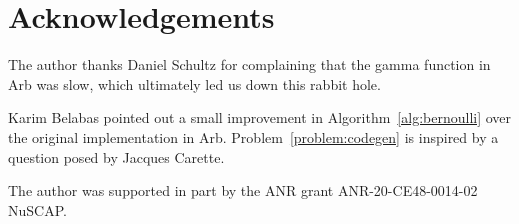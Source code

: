 \documentclass[reqno]{amsart}
\theoremstyle{definition}
\begin{document}
\section{Acknowledgements}

The author thanks Daniel Schultz for complaining that
the gamma function in Arb was slow, which ultimately led us down this rabbit hole.

Karim Belabas pointed out a small improvement in Algorithm~\ref{alg:bernoulli} over
the original implementation in Arb.
Problem~\ref{problem:codegen} is inspired by a question posed by Jacques Carette.

The author was supported in part by the ANR grant ANR-20-CE48-0014-02 NuSCAP.

%
%


\end{document}
